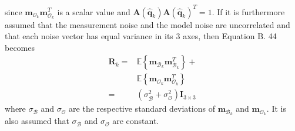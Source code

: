 since $\mathbf{m}_{\mathcal{O}_k} \mathbf{m}_{\mathcal{O}_k}^{T}$ is a scalar value and $\mathbf{A}\left(\hat{\mathbf{q}}_{k}\right) \mathbf{A}\left(\hat{\mathbf{q}}_{k}\right)^{T}=1$. If it is furthermore assumed that the measurement noise and the model noise are uncorrelated and that each noise vector has equal variance in its 3 axes, then Equation B. 44 becomes
$$
\begin{aligned}
\mathbf{R}_{k}=& \mathbb{E}\left\{\mathbf{m}_{\mathcal{B}_k} \mathbf{m}_{\mathcal{B}_k}^{T}\right\}+\\
& \mathbb{E}\left\{\mathbf{m}_{\mathcal{O}_k} \mathbf{m}_{\mathcal{O}_k}^{T}\right\} \\
=&\left(\sigma_{\mathcal{B}}^{2}+\sigma_{\mathcal{O}}^{2}\right) \mathbf{I}_{3 \times 3}
\end{aligned}
$$
where $\sigma_{\mathcal{B}}$ and $\sigma_{\mathcal{O}}$ are the respective standard deviations of $\mathbf{m}_{\mathcal{B}_k}$ and $\mathbf{m}_{\mathcal{O}_k}$. It is also assumed that $\sigma_{\mathcal{B}}$ and $\sigma_{\mathcal{O}}$ are constant.